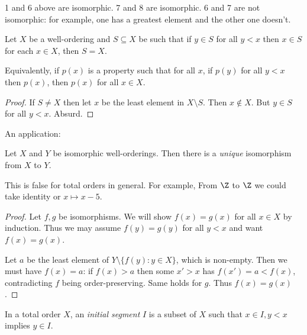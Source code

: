 \documentclass[a4paper]{article}
\begin{document}
\begin{eg}
  1 and 6 above are isomorphic. 7 and 8 are isomorphic. 6 and 7 are not isomorphic: for example, one has a greatest element and the other one doesn't.
\end{eg}

\begin{proposition}
  Let \(X\) be a well-ordering and \(S \subseteq X\) be such that if \(y \in S\) for all \(y < x\) then \(x \in S\) for each \(x \in X\), then \(S = X\).

  Equivalently, if \(p(x)\) is a property such that for all \(x\), if \(p(y)\) for all \(y < x\) then \(p(x)\), then \(p(x)\) for all \(x \in X\).
\end{proposition}

\begin{proof}
  If \(S \neq X\) then let \(x\) be the least element in \(X \setminus S\). Then \(x \notin X\). But \(y \in S\) for all \(y < x\). Absurd.
\end{proof}

An application:

\begin{proposition}
  Let \(X\) and \(Y\) be isomorphic well-orderings. Then there is a \emph{unique} isomorphism from \(X\) to \(Y\).
\end{proposition}

\begin{remark}
  This is false for total orders in general. For example, From \(\Z\) to \(\Z\) we could take identity or \(x \mapsto x - 5\).
\end{remark}

\begin{proof}
  Let \(f, g\) be isomorphisms. We will show \(f(x) = g(x)\) for all \(x \in X\) by induction. Thus we may assume \(f(y) = g(y)\) for all \(y < x\) and want \(f(x) = g(x)\).

  Let \(a\) be the least element of \(Y \setminus \{f(y): y \in X\}\), which is non-empty. Then we must have \(f(x) = a\): if \(f(x) > a\) then some \(x' > x\) has \(f(x') = a < f(x)\), contradicting \(f\) being order-preserving. Same holds for \(g\). Thus \(f(x) = g(x)\).
\end{proof}

\begin{definition}
  In a total order \(X\), an \emph{initial segment} \(I\) is a subset of \(X\) such that \(x \in I, y < x\) implies \(y \in I\).
\end{definition}
\end{document}
